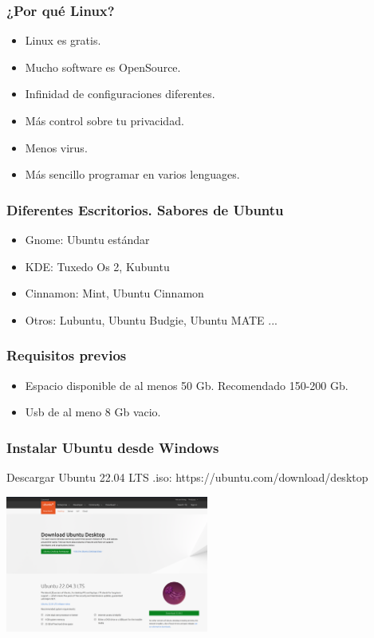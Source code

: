 \documentclass[10pt]{beamer}
\begin{document}
	\begin{frame}
		\frametitle{¿Por qué Linux?}
		\begin{itemize}
			\item Linux es gratis.\\
			\item Mucho software es OpenSource.\\
			\item Infinidad de configuraciones diferentes.\\
			\item Más control sobre tu privacidad.\\
			\item Menos virus.\\
			\item Más sencillo programar en varios lenguages.
		\end{itemize}
	\end{frame}
	
	\begin{frame}
		\frametitle{Diferentes Escritorios. Sabores de Ubuntu}
		\begin{itemize}
			\item Gnome: Ubuntu estándar
			\item KDE: Tuxedo Os 2, Kubuntu
			\item Cinnamon: Mint, 
			Ubuntu Cinnamon
			\item Otros: Lubuntu, Ubuntu Budgie, 
			Ubuntu MATE ...
		\end{itemize}
	\end{frame}
	
	\begin{frame}
		\frametitle{Requisitos previos}
		\begin{itemize}
			\item Espacio disponible de al menos 50 Gb. Recomendado 150-200 Gb.
			\item  Usb de al meno 8 Gb vacio.
		\end{itemize}
	\end{frame}
	
	\begin{frame}
		\frametitle{Instalar Ubuntu desde Windows}
		Descargar Ubuntu 22.04 LTS .iso: https://ubuntu.com/download/desktop\\
		\begin{center}
			\includegraphics[width=0.5\textwidth]{ubuntu}
		\end{center}
	\end{frame}
	
\end{document}
